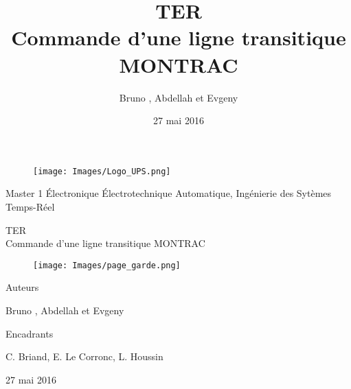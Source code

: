 \documentclass[a4paper,french, titlepage]{book}
\title{{\Huge TER}\\Commande d'une ligne transitique MONTRAC\\}
\author{Bruno \bsc{Dato}, Abdellah \bsc{Elgourain} et Evgeny \bsc{Shulga}}
\date{27 mai 2016}
\begin{document}
 
\thispagestyle{empty}

\begin{center}

\begin{figure}[H] 
\begin{center}
\texttt{[image: Images/Logo\_UPS.png]} 
\end{center}
\end{figure}

\vspace{0.5cm}

Master 1 Électronique Électrotechnique Automatique, Ingénierie des Sytèmes Temps-Réel  

\vspace{3cm}

{\Huge TER}\\{\Huge Commande d'une ligne transitique MONTRAC}\\

\vspace{1cm}

\begin{figure}[H] 
\begin{center}
\texttt{[image: Images/page\_garde.png]}
\end{center} 
\end{figure} 

\vspace{1cm}

{\LARGE Auteurs}\\

\vspace{0.5cm}

Bruno , Abdellah  et Evgeny \\

\vspace{1cm}

{\Large Encadrants}\\

\vspace{0.5cm}

C. Briand, E. Le Corronc, L. Houssin \\ 

\vspace{3cm}


27 mai 2016




\end{center}
\end{document}

